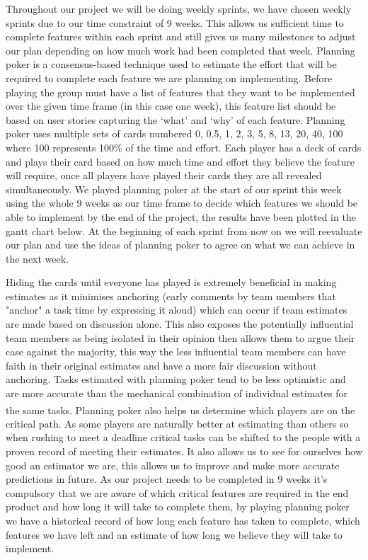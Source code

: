 \documentclass[10pt, a4paper]{article}
\begin{document}
Throughout our project we will be doing weekly sprints, we have chosen weekly sprints due to our time constraint of 9 weeks. This allows us sufficient time to complete features within each sprint and still gives us many milestones to adjust our plan depending on how much work had been completed that week. Planning poker is a consensus-based technique used to estimate the effort that will be required to complete each feature we are planning on implementing. Before playing the group must have a list of features that they want to be implemented over the given time frame (in this case one week), this feature list should be based on user stories capturing the ‘what’ and ‘why’ of each feature. Planning poker uses multiple sets of cards numbered 0, 0.5, 1, 2, 3, 5, 8, 13, 20, 40, 100 where 100 represents 100\% of the time and effort. Each player has a deck of cards and plays their card based on how much time and effort they believe the feature will require, once all players have played their cards they are all revealed simultaneously. We played planning poker at the start of our sprint this week using the whole 9 weeks as our time frame to decide which features we should be able to implement by the end of the project, the results have been plotted in the gantt chart below. At the beginning of each sprint from now on we will reevaluate our plan and use the ideas of planning poker to agree on what we can achieve in the next week.

Hiding the cards until everyone has played is extremely beneficial in making estimates as it minimises anchoring (early comments by team members that "anchor" a task time by expressing it aloud) which can occur if team estimates are made based on discussion alone. This also exposes the potentially influential team members as being isolated in their opinion then allows them to argue their case against the majority, this way the less influential team members can have faith in their original estimates and have a more fair discussion without anchoring. Tasks estimated with planning poker tend to be less optimistic and are more accurate than the mechanical combination of individual estimates for the same tasks\textsuperscript{\cite{omgnames}}. Planning poker also helps us determine which players are on the critical path. As some players are naturally better at estimating than others so when rushing to meet a deadline critical tasks can be shifted to the people with a proven record of meeting their estimates. It also allows us to see for ourselves how good an estimator we are, this allows us to improve and make more accurate predictions in future. As our project needs to be completed in 9 weeks it’s compulsory that we are aware of which critical features are required in the end product and how long it will take to complete them, by playing planning poker we have a historical record of how long each feature has taken to complete, which features we have left and an estimate of how long we believe they will take to implement.
\end{document}
